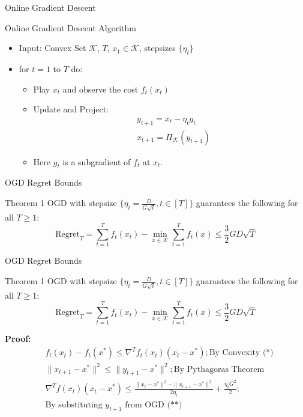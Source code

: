 \documentclass[
	11pt, %
]{beamer}
\begin{document}
\begin{frame}{Online Gradient Descent}
    \begin{block}{Online Gradient Descent Algorithm}
    \begin{itemize}
        \item Input: Convex Set $\mathcal{K}$, $T$, $x_1 \in \mathcal{K}$, stepsizes $\{\eta_t\}$
        \item for $t = 1$ to $T$ do:
        \begin{itemize}
            \item Play $x_t$ and observe the cost $f_t (x_t)$
            \item Update and Project:
            $$
            \begin{aligned}
                & y_{t+1} = x_t - \eta_t g_t \\
                & x_{t+1} = \Pi_{\mathcal{K}} (y_{t+1})
            \end{aligned}
            $$
            \item Here $g_t$ is a subgradient of $f_t$ at $x_t$.
        \end{itemize}
    \end{itemize}
    \end{block}
\end{frame}

\begin{frame}{OGD Regret Bounds}
    \begin{block}{Theorem 1}
        OGD with stepsize $\{\eta_t = \frac{D}{G\sqrt{t}}, t \in [T]\}$ guarantees the following for all $T \ge 1$:
        $$
        \text{Regret}_T = \sum_{t = 1}^{T} f_{t} (x_t) - \min_{x\in \mathcal{K} } \sum_{t = 1}^{T} f_{t} (x) \le \frac{3}{2} GD\sqrt{T}
        $$
    \end{block}
\end{frame}

\begin{frame}{OGD Regret Bounds}
    \begin{block}{Theorem 1}
        OGD with stepsize $\{\eta_t = \frac{D}{G\sqrt{t}}, t \in [T]\}$ guarantees the following for all $T \ge 1$:
        $$
        \text{Regret}_T = \sum_{t = 1}^{T} f_{t} (x_t) - \min_{x\in \mathcal{K} } \sum_{t = 1}^{T} f_{t} (x) \le \frac{3}{2} GD\sqrt{T}
        $$
    \end{block}
    \textbf{Proof:}
    $$
    \begin{aligned}
        & f_t (x_t) - f_t (x^*) \le \nabla^T f_t (x_t) (x_t - x^*); \text{By Convexity (*)} \\
        & \|x_{t+1} - x^*\|^2 \le \|y_{t+1} - x^*\|^2; \text{By Pythagoras Theorem} \\
        & \nabla^T f(x_t) (x_t - x^*) \le \frac{\|x_t - x^*\|^2 - \|x_{t+1} - x^*\|^2}{2\eta_t} + \frac{\eta_t G^2}{2}; \\
        & \text{By substituting $y_{t+1}$ from OGD (**)}
    \end{aligned}
    $$
\end{frame}
\end{document}
